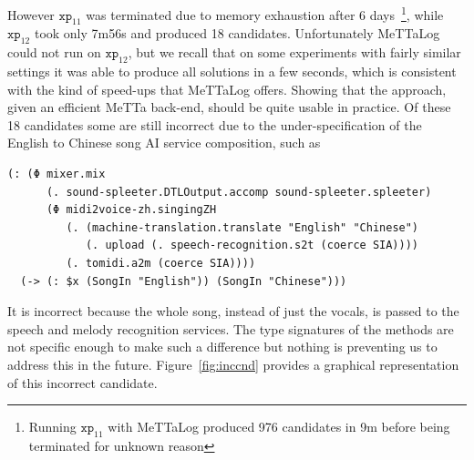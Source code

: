 \documentclass[]{report}
\begin{document}
However $\texttt{xp}_{11}$ was terminated due to memory exhaustion
after 6 days~\footnote{Running $\texttt{xp}_{11}$ with MeTTaLog
produced 976 candidates in 9m before being terminated for unknown
reason}, while $\texttt{xp}_{12}$ took only 7m56s and produced 18
candidates.  Unfortunately MeTTaLog could not run on
$\texttt{xp}_{12}$, but we recall that on some experiments with fairly
similar settings it was able to produce all solutions in a few
seconds, which is consistent with the kind of speed-ups that MeTTaLog
offers.  Showing that the approach, given an efficient MeTTa back-end,
should be quite usable in practice.  Of these 18 candidates some are
still incorrect due to the under-specification of the English to
Chinese song AI service composition, such as
\begin{small}
\begin{verbatim}
(: (Φ mixer.mix
      (. sound-spleeter.DTLOutput.accomp sound-spleeter.spleeter)
      (Φ midi2voice-zh.singingZH
         (. (machine-translation.translate "English" "Chinese")
            (. upload (. speech-recognition.s2t (coerce SIA))))
         (. tomidi.a2m (coerce SIA))))
  (-> (: $x (SongIn "English")) (SongIn "Chinese")))
\end{verbatim}
\end{small}
It is incorrect because the whole song, instead of just the vocals, is
passed to the speech and melody recognition services.  The type
signatures of the methods are not specific enough to make such a
difference but nothing is preventing us to address this in the future.
Figure~\ref{fig:inccnd} provides a graphical representation of this
incorrect candidate.
\end{document}

